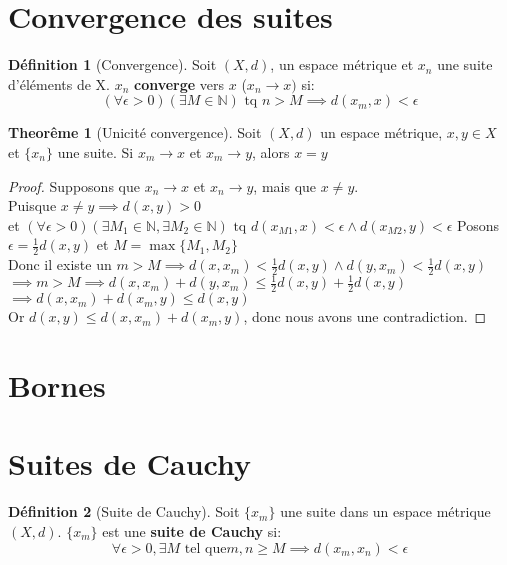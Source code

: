 \documentclass[12pt]{book}
\let\Bbb\mathbb
\def\sep{\phantom{}}
\theoremstyle{definition}
\newtheorem{definition}{Définition}[section]
\newtheorem{theorem}{Theorême}[section]
\begin{document}
\section{Convergence des suites}
\begin{definition}[Convergence]
    \label{def:convergence_metrique}
    Soit $(X, d)$, un espace métrique et ${x_n}$ une suite d'éléments de X. ${x_n}$ \textbf{converge} vers $x$ ($x_n \to x)$ si:
    $$ (\forall \epsilon > 0)(\exists M \in \Bbb N)\text{ tq }n > M \implies d(x_m, x) < \epsilon $$
\end{definition}

\begin{theorem}[Unicité convergence]
    Soit $(X, d)$ un espace métrique, $x, y \in X$ et $\{x_n\}$ une suite. Si $x_m \to x$ et $x_m \to y$, alors $x = y$
\end{theorem}

\begin{proof}
    Supposons que $x_n \to x$ et $x_n \to y$, mais que $x \neq y$. \sep \\
    Puisque $x \neq y \implies d(x, y) > 0$ \sep \\
    et $(\forall \epsilon > 0)(\exists M_1 \in \Bbb N, \exists M_2 \in \Bbb N)\text{ tq }d(x_{M1}, x) < \epsilon \land d(x_{M2}, y) < \epsilon$ 
    Posons $\epsilon = \frac{1}{2}d(x, y)$ et $M = \max{\{M_1,M_2\}}$ \sep \\
    Donc il existe un $m > M \implies d(x, x_m) < \frac{1}{2}d(x, y) \land d(y, x_m) < \frac{1}{2}d(x, y)$ \sep \\
    $\implies m > M \implies d(x, x_m) + d(y, x_m) \leq \frac{1}{2}d(x, y) + \frac{1}{2}d(x, y)$ \sep \\
    $\implies d(x, x_m) + d(x_m, y) \leq d(x, y)$ \sep \\
    Or $d(x, y) \leq d(x, x_m) + d(x_m, y)$, donc nous avons une contradiction.
\end{proof}
\section{Bornes}

\section{Suites de Cauchy}
\begin{definition}[Suite de Cauchy]
    \label{def:suite_cauchy}
    Soit $\{x_m\}$ une suite dans un espace métrique $(X, d)$. $\{x_m\}$ est une \textbf{suite de Cauchy} si:
    $$ \forall \epsilon > 0, \exists M \text{ tel que} m, n \geq M \implies d(x_m, x_n) < \epsilon $$
\end{definition}
\end{document}
